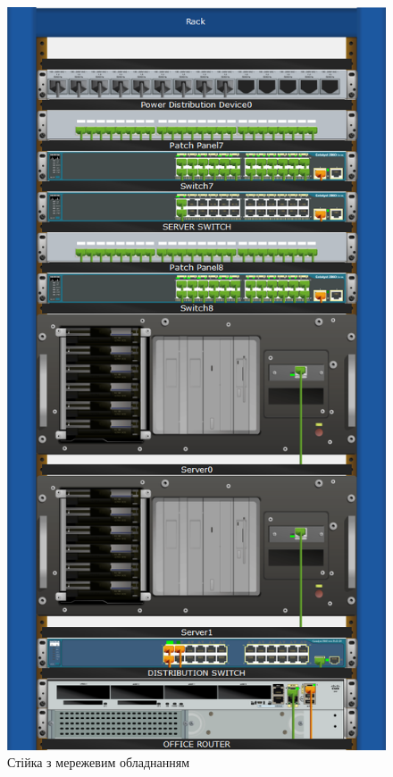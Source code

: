 \documentclass[
  ukrainian,
  simple,
  floatsection,
]{eskdnaukvd}
\newlength{\gridunitwidth}
\begin{document}
      \begin{figure}[!htbp]
        \centering
        \includegraphics[width = 6 \gridunitwidth]{./assets/07-wiring-closet-04.png}
        \caption{Стійка з мережевим обладнанням}
        \label{fig:wiring-closet}
      \end{figure}
\end{document}

